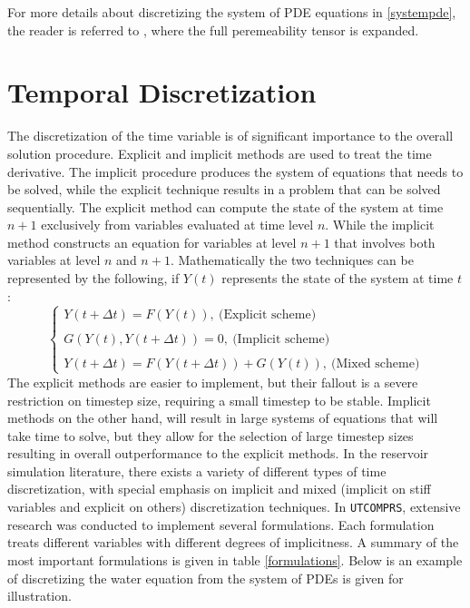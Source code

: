 For more details about discretizing the system of PDE equations in \ref{systempde}, the reader is referred to \cite{phdfernandes}, where the full
peremeability tensor is expanded.

\section{Temporal Discretization}
The discretization of the time variable is of significant importance to the overall solution procedure.
Explicit and implicit methods are used to treat the time derivative. The implicit procedure produces the 
system of equations that needs to be solved, while the explicit technique results in a problem that can be
solved sequentially. The explicit method can compute the state of the system at time $n+1$ exclusively from 
variables evaluated at time level $n$. While the implicit method constructs an equation for variables at level
$n+1$ that involves both variables at level $n$ and $n+1$. Mathematically the two techniques can be represented by 
the following, if $Y(t)$ represents the state of the system at time $t$:
\begingroup\makeatletter\def\f@size{12}\check@mathfonts
\begin{equation}
	\begin{cases}
		Y(t+\Delta t) = F(Y(t)), \ \text{(Explicit scheme)}\\\\
		G(Y(t), Y(t+\Delta t)) = 0, \ \text{(Implicit scheme)}\\\\
		Y(t+\Delta t) = F(Y(t+\Delta t)) + G(Y(t)), \ \text{(Mixed scheme)}
	\end{cases}
\end{equation}\endgroup
The explicit methods are easier to implement, but their fallout is a severe restriction on timestep size, 
requiring a small timestep to be stable. Implicit methods on the other hand, will result in large systems of 
equations that will take time to solve, but they allow for the selection of large timestep sizes resulting in 
overall outperformance to the explicit methods. In the reservoir simulation literature, there exists a variety of
different types of time discretization, with special emphasis on implicit and mixed (implicit on stiff variables and explicit on others) 
discretization techniques. In \texttt{UTCOMPRS}, extensive research was conducted to implement several formulations. Each formulation treats
different variables with different degrees of implicitness. A summary of the most important formulations is given in table \ref{formulations}.
Below is an example of discretizing the water equation from the system of PDEs is given for illustration.

